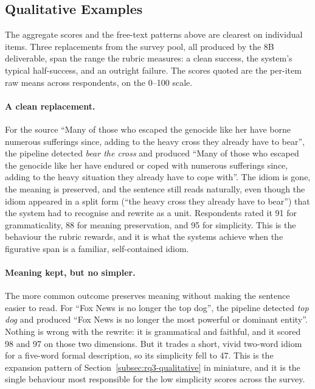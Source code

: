 \subsection{Qualitative Examples}
\label{subsec:rq3-examples}

The aggregate scores and the free-text patterns above are clearest on individual items. Three replacements from the survey pool, all produced by the 8B deliverable, span the range the rubric measures: a clean success, the system's typical half-success, and an outright failure. The scores quoted are the per-item raw means across respondents, on the 0--100 scale.

\paragraph{A clean replacement.} For the source ``Many of those who escaped the genocide like her have borne numerous sufferings since, adding to the heavy cross they already have to bear'', the pipeline detected \textit{bear the cross} and produced ``Many of those who escaped the genocide like her have endured or coped with numerous sufferings since, adding to the heavy situation they already have to cope with''. The idiom is gone, the meaning is preserved, and the sentence still reads naturally, even though the idiom appeared in a split form (``the heavy cross they already have to bear'') that the system had to recognise and rewrite as a unit. Respondents rated it 91 for grammaticality, 88 for meaning preservation, and 95 for simplicity. This is the behaviour the rubric rewards, and it is what the systems achieve when the figurative span is a familiar, self-contained idiom.

\paragraph{Meaning kept, but no simpler.} The more common outcome preserves meaning without making the sentence easier to read. For ``Fox News is no longer the top dog'', the pipeline detected \textit{top dog} and produced ``Fox News is no longer the most powerful or dominant entity''. Nothing is wrong with the rewrite: it is grammatical and faithful, and it scored 98 and 97 on those two dimensions. But it trades a short, vivid two-word idiom for a five-word formal description, so its simplicity fell to 47. This is the expansion pattern of Section~\ref{subsec:rq3-qualitative} in miniature, and it is the single behaviour most responsible for the low simplicity scores across the survey.

